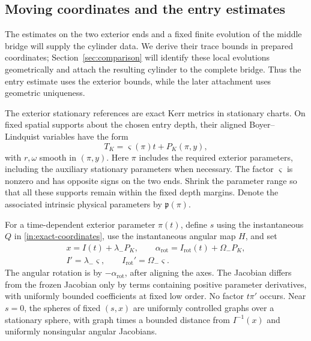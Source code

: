 \subsection{Moving coordinates and the entry estimates}

The estimates on the two exterior ends and a fixed finite evolution of
the middle bridge will supply the cylinder data. We derive their
trace bounds in prepared coordinates; Section~\ref{sec:comparison} will
identify these local evolutions geometrically and attach the resulting
cylinder to the complete bridge. Thus the entry estimate uses the
exterior bounds, while the later attachment uses geometric uniqueness.

The exterior stationary references are exact Kerr metrics in stationary
charts. On fixed spatial supports about the chosen entry depth, their
aligned Boyer--Lindquist variables have the form
\[
 T_K=\varsigma(\pi)t+P_K(\pi,y),
\]
with $r,\omega$ smooth in $(\pi,y)$. Here $\pi$ includes the required
exterior parameters, including the auxiliary stationary parameters
when necessary. The factor $\varsigma$ is nonzero and has opposite
signs on the two ends. Shrink the parameter range so that all these
supports remain within the fixed depth margins. Denote the associated
intrinsic physical parameters by $\mathfrak p(\pi)$.

\begin{lemma}
\label{in:moving-coordinates}
For a time-dependent exterior parameter $\pi(t)$, define $s$ using
the instantaneous $Q$ in \eqref{in:exact-coordinates}, use the
instantaneous angular map $H$, and set
\begin{equation}\label{in:phases}
\begin{gathered}
 x=I(t)+\lambda_-P_K,\qquad
 \alpha_{\mathrm{rot}}=I_{\mathrm{rot}}(t)+\Omega_-P_K,\\
 I'=\lambda_-\varsigma,\qquad
 I_{\mathrm{rot}}'=\Omega_-\varsigma.
\end{gathered}
\end{equation}
The angular rotation is by $-\alpha_{\mathrm{rot}}$, after aligning
the axes. The Jacobian differs from the frozen Jacobian only by terms
containing positive parameter derivatives, with uniformly bounded
coefficients at fixed low order. No factor $t\pi'$ occurs.
Near $s=0$, the spheres of fixed $(s,x)$ are uniformly controlled
graphs over a stationary sphere, with graph times a bounded distance
from $I^{-1}(x)$ and uniformly nonsingular angular Jacobians.
\end{lemma}

